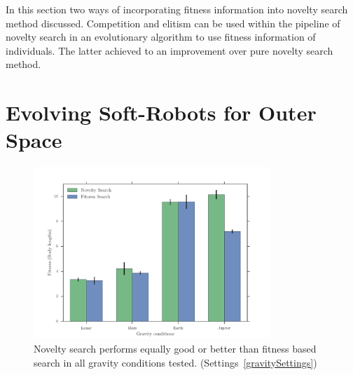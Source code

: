 In this section two ways of incorporating fitness information into novelty search method discussed. Competition and elitism can be used within the pipeline of novelty search in an evolutionary algorithm to use fitness information of individuals. The latter achieved to an improvement over pure novelty search method.
















\clearpage

\section{Evolving Soft-Robots for Outer Space}  

\begin{figure}[t!]
\centering
\includegraphics[width=0.8\textwidth]{../Figures/Results/GravityExperiment.pdf}
\caption{Novelty search performs equally good or better than fitness based search in all gravity conditions tested. (Settings~\ref{gravitySettings})}
\label{fig:gravityConditions}
\end{figure}

